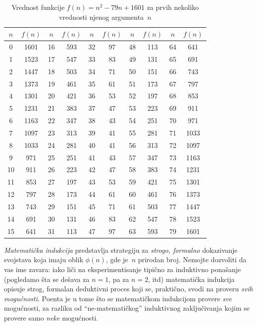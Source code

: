 \begin{table}
\centering
\begin{tabular}{|cc|cc|cc|cc|cc|}
  \hline
  $n$&$f(n)$&$n$&$f(n)$&$n$&$f(n)$&$n$&$f(n)$&$n$&$f(n)$\\
  \hline
  0 & 1601 & 16 & 593 & 32 & 97 & 48 & 113 & 64 & 641 \\
  1 & 1523 & 17 & 547 & 33 & 83 & 49 & 131 & 65 & 691 \\
  2 & 1447 & 18 & 503 & 34 & 71 & 50 & 151 & 66 & 743 \\
  3 & 1373 & 19 & 461 & 35 & 61 & 51 & 173 & 67 & 797 \\
  4 & 1301 & 20 & 421 & 36 & 53 & 52 & 197 & 68 & 853 \\
  5 & 1231 & 21 & 383 & 37 & 47 & 53 & 223 & 69 & 911 \\
  6 & 1163 & 22 & 347 & 38 & 43 & 54 & 251 & 70 & 971 \\
  7 & 1097 & 23 & 313 & 39 & 41 & 55 & 281 & 71 & 1033 \\
  8 & 1033 & 24 & 281 & 40 & 41 & 56 & 313 & 72 & 1097 \\
  9 & 971 & 25 & 251 & 41 & 43 & 57 & 347 & 73 & 1163 \\
  10 & 911 & 26 & 223 & 42 & 47 & 58 & 383 & 74 & 1231 \\
  11 & 853 & 27 & 197 & 43 & 53 & 59 & 421 & 75 & 1301 \\
  12 & 797 & 28 & 173 & 44 & 61 & 60 & 461 & 76 & 1373 \\
  13 & 743 & 29 & 151 & 45 & 71 & 61 & 503 & 77 & 1447 \\
  14 & 691 & 30 & 131 & 46 & 83 & 62 & 547 & 78 & 1523 \\
  15 & 641 & 31 & 113 & 47 & 97 & 63 & 593 & 79 & 1601 \\
  \hline
\end{tabular}
\caption{Vrednost funkcije $f(n) = n^2 - 79n + 1601$ za prvih nekoliko vrednosti njenog argumenta~$n$}
\label{ft05.tabela.indukcija}
\end{table}


\bigskip

\emph{Matemati\v cka indukcija} predstavlja strategiju za \emph{strogo, formalno} dokazivanje
svojstava koja imaju oblik $\phi(n)$, gde je~$n$ prirodan broj.
Nemojte dozvoliti da vas ime zavara: iako li\v ci na eksperimentisanje tipi\v cno za induktivno
pona\v sanje (pogledamo \v sta se de\v sava za $n = 1$, pa za $n = 2$, itd) matemati\v cka indukcija
opisuje strog, formalan deduktivni proces koji se, prakti\v cno, svodi na proveru \emph{svih mogu\'cnosti}.
Poenta je u tome \v sto se matemati\v ckom indukcijom provere \emph{sve} mogu\'cnosti,
za razliku od \enquote{ne-matemati\v ckog} induktivnog zaklju\v civanja kojim se provere samo \emph{neke} mogu\'cnosti.

